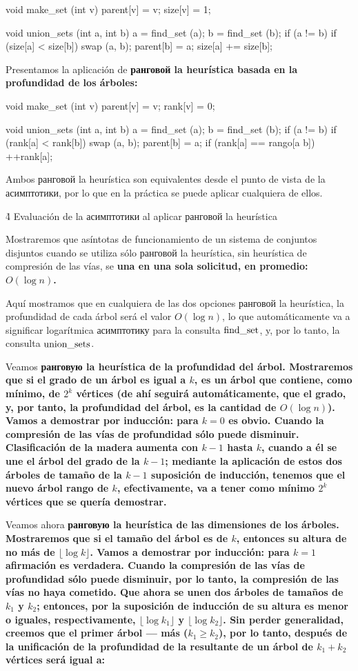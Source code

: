 \code
void make_set (int v) {
parent[v] = v;
size[v] = 1;
}

void union_sets (int a, int b) {
a = find_set (a);
b = find_set (b);
if (a != b) {
if (size[a] < size[b])
swap (a, b);
parent[b] = a;
size[a] += size[b];
}
}
\endcode

Presentamos la aplicación de \bf{ранговой la heurística basada en la profundidad de los árboles}:

\code
void make_set (int v) {
parent[v] = v;
rank[v] = 0;
}

void union_sets (int a, int b) {
a = find_set (a);
b = find_set (b);
if (a != b) {
if (rank[a] < rank[b])
swap (a, b);
parent[b] = a;
if (rank[a] == rango[a b])
++rank[a];
}
}
\endcode

Ambos ранговой la heurística son equivalentes desde el punto de vista de la асимптотики, por lo que en la práctica se puede aplicar cualquiera de ellos.


\h4{ Evaluación de la асимптотики al aplicar ранговой la heurística }

Mostraremos que asíntotas de funcionamiento de un sistema de conjuntos disjuntos cuando se utiliza sólo ранговой la heurística, sin heurística de compresión de las vías, se \bf{una} en una sola solicitud, en promedio: $O (\log n)$.

Aquí mostramos que en cualquiera de las dos opciones ранговой la heurística, la profundidad de cada árbol será el valor $O (\log n)$, lo que automáticamente va a significar logarítmica асимптотику para la consulta $\rm find\_set$, y, por lo tanto, la consulta $\rm union\_sets$.

Veamos \bf{ранговую la heurística de la profundidad del árbol}. Mostraremos que si el grado de un árbol es igual a $k$, es un árbol que contiene, como mínimo, de $2^k$ vértices (de ahí seguirá automáticamente, que el grado, y, por tanto, la profundidad del árbol, es la cantidad de $O(\log n)$). Vamos a demostrar por inducción: para $k=0$ es obvio. Cuando la compresión de las vías de profundidad sólo puede disminuir. Clasificación de la madera aumenta con $k-1$ hasta $k$, cuando a él se une el árbol del grado de la $k-1$; mediante la aplicación de estos dos árboles de tamaño de la $k-1$ suposición de inducción, tenemos que el nuevo árbol rango de $k$, efectivamente, va a tener como mínimo $2^k$ vértices que se quería demostrar.

Veamos ahora \bf{ранговую la heurística de las dimensiones de los árboles}. Mostraremos que si el tamaño del árbol es de $k$, entonces su altura de no más de $\lfloor \log k \rfloor$. Vamos a demostrar por inducción: para $k=1$ afirmación es verdadera. Cuando la compresión de las vías de profundidad sólo puede disminuir, por lo tanto, la compresión de las vías no haya cometido. Que ahora se unen dos árboles de tamaños de $k_1$ y $k_2$; entonces, por la suposición de inducción de su altura es menor o iguales, respectivamente, $\lfloor \log k_1 \rfloor$ y $\lfloor \log k_2 \rfloor$. Sin perder generalidad, creemos que el primer árbol --- más ($k_1 \ge k_2$), por lo tanto, después de la unificación de la profundidad de la resultante de un árbol de $k_1+k_2$ vértices será igual a:

